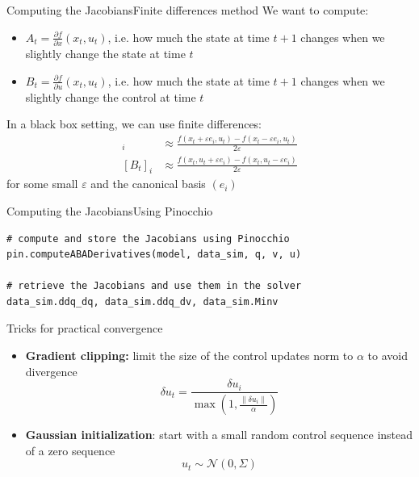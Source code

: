 \documentclass[aspectratio=169,draft]{beamer}
\begin{document}
\begin{frame}{Computing the Jacobians}{Finite differences method}
    We want to compute:
    \begin{itemize}
        \item $A_t=\frac{\partial f}{\partial x}(x_t, u_t)$, i.e. how much the state at time $t+1$ changes when we slightly change the state at time $t$
        \item $B_t=\frac{\partial f}{\partial u}(x_t, u_t)$, i.e. how much the state at time $t+1$ changes when we slightly change the control at time $t$
    \end{itemize}
    In a black box setting, we can use finite differences:
    \begin{align*}
        [A_t]_i &\approx \frac{f(x_t+\varepsilon e_i, u_t)-f(x_t-\varepsilon e_i, u_t)}{2\varepsilon}\\
        [B_t]_i &\approx \frac{f(x_t, u_t+\varepsilon e_i)-f(x_t, u_t-\varepsilon e_i)}{2\varepsilon}
    \end{align*}
    for some small $\varepsilon$ and the canonical basis $(e_i)$
\end{frame}

\begin{frame}[fragile]{Computing the Jacobians}{Using Pinocchio}
\begin{verbatim}
# compute and store the Jacobians using Pinocchio
pin.computeABADerivatives(model, data_sim, q, v, u)

# retrieve the Jacobians and use them in the solver
data_sim.ddq_dq, data_sim.ddq_dv, data_sim.Minv
\end{verbatim}
\end{frame}

\begin{frame}{Tricks for practical convergence}
    \begin{itemize}
        \item \textbf{Gradient clipping:} limit the size of the control updates norm to $\alpha$ to avoid divergence
        \begin{equation*}
            \delta u_t = \frac{\delta u_i}{\max\left(1, \frac{\|\delta u_i\|}{\alpha}\right)}
        \end{equation*}
        \item \textbf{Gaussian initialization}: start with a small random control sequence instead of a zero sequence
        \begin{equation*}
            u_t \sim \mathcal{N}(0, \Sigma)
        \end{equation*}
    \end{itemize}
\end{frame}
\end{document}
